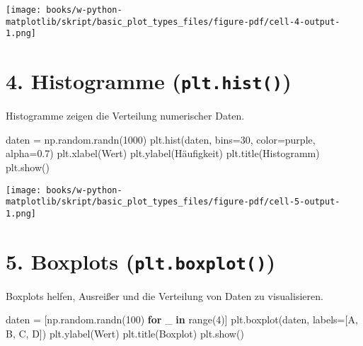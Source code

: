 \documentclass[
  letterpaper,
  DIV=11,
  numbers=noendperiod]{scrreprt}
\newenvironment{Shaded}{\begin{snugshade}}{\end{snugshade}}
\newcommand{\BuiltInTok}[1]{\textcolor[rgb]{0.00,0.23,0.31}{#1}}
\newcommand{\ControlFlowTok}[1]{\textcolor[rgb]{0.00,0.23,0.31}{\textbf{#1}}}
\newcommand{\DecValTok}[1]{\textcolor[rgb]{0.68,0.00,0.00}{#1}}
\newcommand{\FloatTok}[1]{\textcolor[rgb]{0.68,0.00,0.00}{#1}}
\newcommand{\KeywordTok}[1]{\textcolor[rgb]{0.00,0.23,0.31}{\textbf{#1}}}
\newcommand{\NormalTok}[1]{\textcolor[rgb]{0.00,0.23,0.31}{#1}}
\newcommand{\OperatorTok}[1]{\textcolor[rgb]{0.37,0.37,0.37}{#1}}
\newcommand{\StringTok}[1]{\textcolor[rgb]{0.13,0.47,0.30}{#1}}
\begin{document}
\begin{tcolorbox}
\texttt{[image: books/w-python-matplotlib/skript/basic\_plot\_types\_files/figure-pdf/cell-4-output-1.png]}

\section{\texorpdfstring{4. Histogramme
(\texttt{plt.hist()})}{4. Histogramme (plt.hist())}}\label{histogramme-plt.hist}

Histogramme zeigen die Verteilung numerischer Daten.

\begin{Shaded}
\begin{Highlighting}[]
\NormalTok{daten }\OperatorTok{=}\NormalTok{ np.random.randn(}\DecValTok{1000}\NormalTok{)}
\NormalTok{plt.hist(daten, bins}\OperatorTok{=}\DecValTok{30}\NormalTok{, color}\OperatorTok{=}\StringTok{\textquotesingle{}purple\textquotesingle{}}\NormalTok{, alpha}\OperatorTok{=}\FloatTok{0.7}\NormalTok{)}
\NormalTok{plt.xlabel(}\StringTok{\textquotesingle{}Wert\textquotesingle{}}\NormalTok{)}
\NormalTok{plt.ylabel(}\StringTok{\textquotesingle{}Häufigkeit\textquotesingle{}}\NormalTok{)}
\NormalTok{plt.title(}\StringTok{\textquotesingle{}Histogramm\textquotesingle{}}\NormalTok{)}
\NormalTok{plt.show()}
\end{Highlighting}
\end{Shaded}

\texttt{[image: books/w-python-matplotlib/skript/basic\_plot\_types\_files/figure-pdf/cell-5-output-1.png]}

\section{\texorpdfstring{5. Boxplots
(\texttt{plt.boxplot()})}{5. Boxplots (plt.boxplot())}}\label{boxplots-plt.boxplot}

Boxplots helfen, Ausreißer und die Verteilung von Daten zu
visualisieren.

\begin{Shaded}
\begin{Highlighting}[]
\NormalTok{daten }\OperatorTok{=}\NormalTok{ [np.random.randn(}\DecValTok{100}\NormalTok{) }\ControlFlowTok{for}\NormalTok{ \_ }\KeywordTok{in} \BuiltInTok{range}\NormalTok{(}\DecValTok{4}\NormalTok{)]}
\NormalTok{plt.boxplot(daten, labels}\OperatorTok{=}\NormalTok{[}\StringTok{\textquotesingle{}A\textquotesingle{}}\NormalTok{, }\StringTok{\textquotesingle{}B\textquotesingle{}}\NormalTok{, }\StringTok{\textquotesingle{}C\textquotesingle{}}\NormalTok{, }\StringTok{\textquotesingle{}D\textquotesingle{}}\NormalTok{])}
\NormalTok{plt.ylabel(}\StringTok{\textquotesingle{}Wert\textquotesingle{}}\NormalTok{)}
\NormalTok{plt.title(}\StringTok{\textquotesingle{}Boxplot\textquotesingle{}}\NormalTok{)}
\NormalTok{plt.show()}
\end{Highlighting}
\end{Shaded}


\end{tcolorbox}
\end{document}
